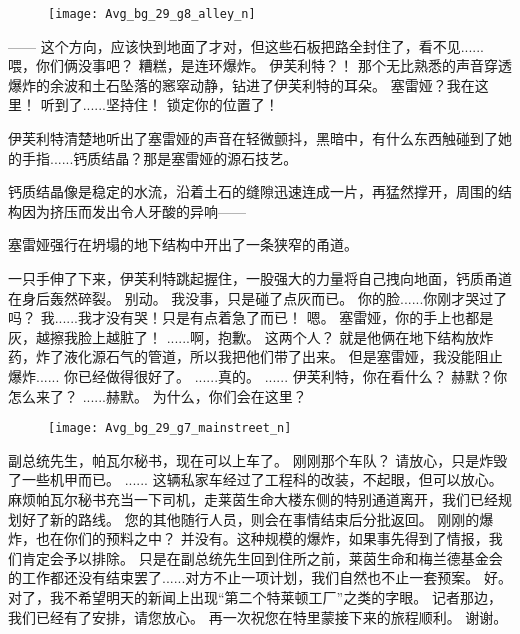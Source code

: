 \documentclass[openany]{book}
\begin{document}
\begin{figure}[h]
    \centering
    \texttt{[image: Avg\_bg\_29\_g8\_alley\_n]}
\end{figure}
\begin{dialogue}
     ——
     这个方向，应该快到地面了才对，但这些石板把路全封住了，看不见......
     喂，你们俩没事吧？
     糟糕，是连环爆炸。
     伊芙利特？！
    那个无比熟悉的声音穿透爆炸的余波和土石坠落的窸窣动静，钻进了伊芙利特的耳朵。
     塞雷娅？我在这里！
     听到了......坚持住！
     锁定你的位置了！\par
    伊芙利特清楚地听出了塞雷娅的声音在轻微颤抖，黑暗中，有什么东西触碰到了她的手指......钙质结晶？那是塞雷娅的源石技艺。\par
    钙质结晶像是稳定的水流，沿着土石的缝隙迅速连成一片，再猛然撑开，周围的结构因为挤压而发出令人牙酸的异响——\par
    塞雷娅强行在坍塌的地下结构中开出了一条狭窄的甬道。\par
    一只手伸了下来，伊芙利特跳起握住，一股强大的力量将自己拽向地面，钙质甬道在身后轰然碎裂。
     别动。
     我没事，只是碰了点灰而已。
     你的脸......你刚才哭过了吗？
     我......我才没有哭！只是有点着急了而已！
     嗯。
     塞雷娅，你的手上也都是灰，越擦我脸上越脏了！
     ......啊，抱歉。
     这两个人？
     就是他俩在地下结构放炸药，炸了液化源石气的管道，所以我把他们带了出来。
     但是塞雷娅，我没能阻止爆炸......
     你已经做得很好了。
     ......真的。
     ......
     伊芙利特，你在看什么？
     赫默？你怎么来了？
     ......赫默。
     为什么，你们会在这里？
\end{dialogue}

\begin{figure}[h]
    \centering
    \texttt{[image: Avg\_bg\_29\_g7\_mainstreet\_n]}
\end{figure}
\begin{dialogue}
     副总统先生，帕瓦尔秘书，现在可以上车了。
     刚刚那个车队？
     请放心，只是炸毁了一些机甲而已。
     ......
     这辆私家车经过了工程科的改装，不起眼，但可以放心。
     麻烦帕瓦尔秘书充当一下司机，走莱茵生命大楼东侧的特别通道离开，我们已经规划好了新的路线。
     您的其他随行人员，则会在事情结束后分批返回。
     刚刚的爆炸，也在你们的预料之中？
     并没有。这种规模的爆炸，如果事先得到了情报，我们肯定会予以排除。
     只是在副总统先生回到住所之前，莱茵生命和梅兰德基金会的工作都还没有结束罢了......对方不止一项计划，我们自然也不止一套预案。
     好。
     对了，我不希望明天的新闻上出现“第二个特莱顿工厂”之类的字眼。
     记者那边，我们已经有了安排，请您放心。
     再一次祝您在特里蒙接下来的旅程顺利。
     谢谢。
\end{dialogue}
\end{document}
